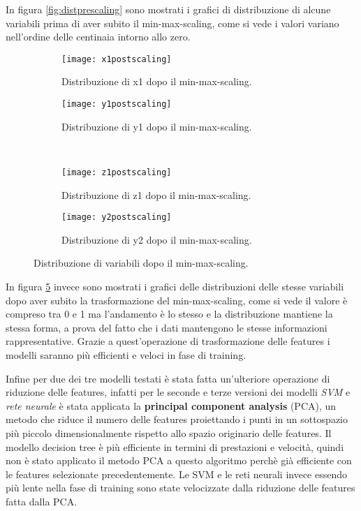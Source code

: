 In figura \ref{fig:distprescaling} sono mostrati i grafici di distribuzione di alcune variabili prima di aver subito il min-max-scaling, come si vede i valori variano nell'ordine delle centinaia intorno allo zero.

\begin{figure}[ht]
    \centering
    \begin{subfigure}[t]{0.4\textwidth}
        \centering\texttt{[image: x1postscaling]}
        \caption{Distribuzione di x1 dopo il min-max-scaling.}
        \label{fig:distpostscaling:x1}
    \end{subfigure}
    \begin{subfigure}[t]{0.4\textwidth}
        \centering\texttt{[image: y1postscaling]}
        \caption{Distribuzione di y1 dopo il min-max-scaling.}
        \label{fig:distpostscaling:y1}
    \end{subfigure}
    \\
    \begin{subfigure}[t]{0.4\textwidth}
        \centering\texttt{[image: z1postscaling]}
        \caption{Distribuzione di z1 dopo il min-max-scaling.}
        \label{fig:distpostscaling:z1}
    \end{subfigure}
    \begin{subfigure}[t]{0.4\textwidth}
        \centering\texttt{[image: y2postscaling]}
        \caption{Distribuzione di y2 dopo il min-max-scaling.}
        \label{fig:distpostscaling:y2}
    \end{subfigure}
    \caption{Distribuzione di variabili dopo il min-max-scaling.}
    \label{fig:distpostscaling}
\end{figure}

In figura \ref{fig:distpostscaling} invece sono mostrati i grafici delle distribuzioni delle stesse variabili dopo aver subito la trasformazione del min-max-scaling, come si vede il valore è compreso tra 0 e 1 ma l'andamento è lo stesso e la distribuzione mantiene la stessa forma, a prova del fatto che i dati mantengono le stesse informazioni rappresentative. Grazie a quest'operazione di trasformazione delle features i modelli saranno più efficienti e veloci in fase di training.

Infine per due dei tre modelli testati è stata fatta un'ulteriore operazione di riduzione delle features, infatti per le seconde e terze versioni dei modelli \textit{SVM} e \textit{rete neurale} è stata applicata la \textbf{principal component analysis} (PCA), un metodo che riduce il numero delle features proiettando i punti in un sottospazio più piccolo dimensionalmente rispetto allo spazio originario delle features. Il modello decision tree è più efficiente in termini di prestazioni e velocità, quindi non è stato applicato il metodo PCA a questo algoritmo perchè già efficiente con le features selezionate precedentemente. Le SVM e le reti neurali invece essendo più lente nella fase di training sono state velocizzate dalla riduzione delle features fatta dalla PCA. 

